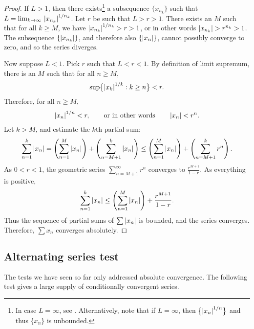 \begin{proof}
If $L > 1$, then there exists\footnote{%
In case $L=\infty$, see .
Alternatively, note that if $L=\infty$, then $\bigl\{ {\left\lvert {x_{n}} \right\rvert}^{1/n} \bigr\}$
and thus $\{ x_n \}$ is unbounded.}
a subsequence $\{ x_{n_k} \}$ such that
$L = \lim_{k\to\infty} \, {\left\lvert {x_{n_k}} \right\rvert}^{1/n_k}$.  Let
$r$ be such that $L > r > 1$.  There exists an $M$ such
that for all $k \geq M$, we have 
${\left\lvert {x_{n_k}} \right\rvert}^{1/n_k} > r > 1$, or in other words
$\left\lvert {x_{n_k}} \right\rvert > r^{n_k} > 1$.
The subsequence 
$\{ \left\lvert {x_{n_k}} \right\rvert \}$, and therefore also
$\{ \left\lvert {x_{n}} \right\rvert \}$,
cannot possibly converge to zero, and so the series diverges.

Now suppose $L < 1$.  Pick $r$ such that $L < r < 1$.
By definition of limit supremum,
there is an $M$ such that for all $n \geq M$,
\begin{equation*}
\sup \bigl\{ {\left\lvert {x_k} \right\rvert}^{1/k} : k \geq n \bigr\} < r .
\end{equation*}
Therefore, for all $n \geq M$,
\begin{equation*}
{\left\lvert {x_n} \right\rvert}^{1/n} < r , \qquad \text{or in other words} \qquad \left\lvert {x_n} \right\rvert < r^n .
\end{equation*}
Let $k > M$, and estimate the $k$th partial sum:
\begin{equation*}
\sum_{n=1}^k \left\lvert {x_n} \right\rvert = 
\left( \sum_{n=1}^M \left\lvert {x_n} \right\rvert \right) + 
\left( \sum_{n=M+1}^k \left\lvert {x_n} \right\rvert \right)
\leq
\left( \sum_{n=1}^M \left\lvert {x_n} \right\rvert \right) + 
\left( \sum_{n=M+1}^k r^n \right) .
\end{equation*}
As $0 < r < 1$,
the geometric series $\sum_{n=M+1}^\infty r^n$ converges to
$\frac{r^{M+1}}{1-r}$.  As everything is positive,
\begin{equation*}
\sum_{n=1}^k \left\lvert {x_n} \right\rvert 
\leq
\left( \sum_{n=1}^M \left\lvert {x_n} \right\rvert \right) + 
\frac{r^{M+1}}{1-r} .
\end{equation*}
Thus the sequence of partial sums of $\sum \left\lvert {x_n} \right\rvert$ is bounded, and
the series converges.  Therefore, $\sum x_n$ converges absolutely.
\end{proof}

\subsection{Alternating series test}

The tests we have seen so far only addressed absolute convergence.  The
following test gives a large supply of conditionally convergent series.

